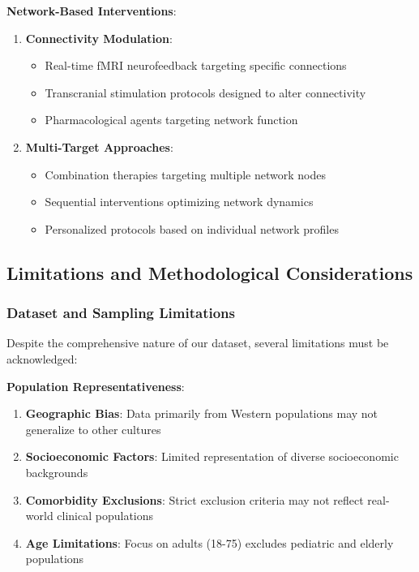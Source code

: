 \textbf{Network-Based Interventions}:

\begin{enumerate}
\item \textbf{Connectivity Modulation}:
   \begin{itemize}
   \item Real-time fMRI neurofeedback targeting specific connections
   \item Transcranial stimulation protocols designed to alter connectivity
   \item Pharmacological agents targeting network function
   \end{itemize}

\item \textbf{Multi-Target Approaches}:
   \begin{itemize}
   \item Combination therapies targeting multiple network nodes
   \item Sequential interventions optimizing network dynamics
   \item Personalized protocols based on individual network profiles
   \end{itemize}
\end{enumerate}

\subsection{Limitations and Methodological Considerations}

\subsubsection{Dataset and Sampling Limitations}

Despite the comprehensive nature of our dataset, several limitations must be acknowledged:

\textbf{Population Representativeness}:

\begin{enumerate}
\item \textbf{Geographic Bias}: Data primarily from Western populations may not generalize to other cultures
\item \textbf{Socioeconomic Factors}: Limited representation of diverse socioeconomic backgrounds
\item \textbf{Comorbidity Exclusions}: Strict exclusion criteria may not reflect real-world clinical populations
\item \textbf{Age Limitations}: Focus on adults (18-75) excludes pediatric and elderly populations
\end{enumerate}

